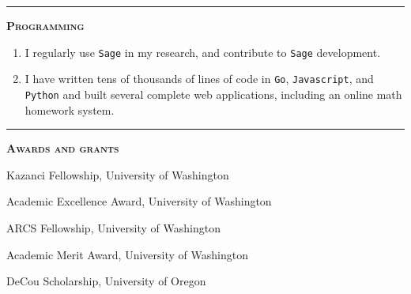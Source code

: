 \documentclass[12pt]{article}
\newcommand{\sectionheading}[1]
{
\bigskip %
\noindent
\hspace{-6.5mm}\textcolor{Gray}{\rule[.75mm]{21.5mm}{1mm}} %
\hspace{.2mm}	%
{\large{\textbf{\textsc{#1}}}} %
}
\newenvironment{date_section}
	{
	\vspace{-1ex}
	\leftmargini = 15ex
		\begin{itemize}[
			labelsep = *,
			labelwidth = 9ex,
			labelindent = 0ex,
			itemindent = !,
			font=\normalfont,
			align=parleft
		]{}
		\itemsep=-1.5mm
	}
	{\end{itemize}\vspace{-2ex}}
\newcommand{\yearmo}[2]{
	\item[
		{\makebox[1ex][r]{#1}}
		\hspace{1ex}
		{\makebox[1ex][l]{#2} }
		] }
\begin{document}
	\sectionheading{Programming}%
	
	\begin{enumerate}[label=$\bullet$, itemsep=-1mm, leftmargin=24mm]
		\item I regularly use {\tt Sage} in my research, and contribute to {\tt Sage} development.
		\item I have written tens of thousands of lines of code in {\tt Go}, {\tt Javascript}, and {\tt Python} and built several complete web applications, including an online math homework system.
	\end{enumerate}




	\sectionheading{Awards and grants}%
	
	\begin{date_section}
		\yearmo{}{2017}%
		Kazanci Fellowship, University of Washington
		\yearmo{}{2014}%
		Academic Excellence Award, University of Washington
		\yearmo{}{2013}%
		ARCS Fellowship, University of Washington
		\yearmo{}{2013}%
		Academic Merit Award, University of Washington
		\yearmo{}{2012}%
		DeCou Scholarship, University of Oregon
	\end{date_section}




%	
%
%		
%			
%			
%			
%			
%			
%		
\end{document}
